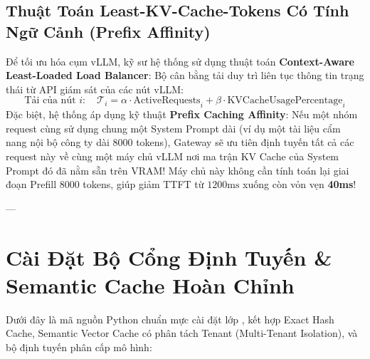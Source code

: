 \subsection{Thuật Toán Least-KV-Cache-Tokens Có Tính Ngữ Cảnh (Prefix Affinity)}
Để tối ưu hóa cụm vLLM, kỹ sư hệ thống sử dụng thuật toán \textbf{Context-Aware Least-Loaded Load Balancer}:
Bộ cân bằng tải duy trì liên tục thông tin trạng thái từ API giám sát của các nút vLLM:
\begin{equation}
\text{Tải của nút } i: \quad \mathcal{T}_i = \alpha \cdot \text{ActiveRequests}_i + \beta \cdot \text{KVCacheUsagePercentage}_i
\end{equation}
Đặc biệt, hệ thống áp dụng kỹ thuật \textbf{Prefix Caching Affinity}:
Nếu một nhóm request cùng sử dụng chung một System Prompt dài (ví dụ một tài liệu cẩm nang nội bộ công ty dài 8000 tokens), Gateway sẽ ưu tiên định tuyến tất cả các request này về cùng một máy chủ vLLM nơi ma trận KV Cache của System Prompt đó đã nằm sẵn trên VRAM! Máy chủ này không cần tính toán lại giai đoạn Prefill 8000 tokens, giúp giảm TTFT từ $1200\text{ms}$ xuống còn vỏn vẹn \textbf{40ms}!

---

\section{Cài Đặt Bộ Cổng Định Tuyến \& Semantic Cache Hoàn Chỉnh}
\label{sec:ch13-implementation}

Dưới đây là mã nguồn Python chuẩn mực cài đặt lớp , kết hợp Exact Hash Cache, Semantic Vector Cache có phân tách Tenant (Multi-Tenant Isolation), và bộ định tuyến phân cấp mô hình:

